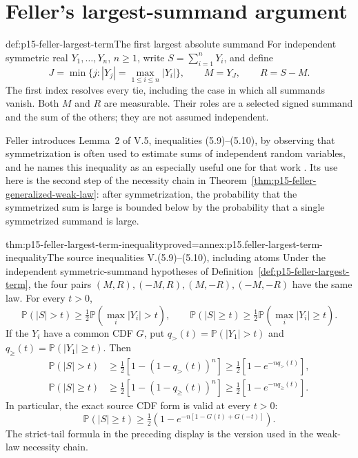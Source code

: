 \section{Feller's largest-summand argument}
\label{sec:p15-feller-largest-summand}

\begin{hbdefinition}{def:p15-feller-largest-term}{The first largest absolute summand}
For independent symmetric real \(Y_1,\ldots,Y_n\), \(n\geq1\),
write \(S=\sum_{i=1}^nY_i\), and define
\[
 J=\min\{j:|Y_j|=\max_{1\leq i\leq n}|Y_i|\},\qquad
 M=Y_J,\qquad R=S-M.
\]
The first index resolves every tie, including the case in which all
summands vanish. Both \(M\) and \(R\) are measurable. Their roles
are a selected signed summand and the sum of the others; they are
not assumed independent.
\end{hbdefinition}

Feller introduces Lemma~2 of V.5, inequalities (5.9)--(5.10), by
observing that symmetrization is often used to estimate sums of
independent random variables, and he names this inequality as an
especially useful one for that work
\cite[V.5, p.~149]{Feller1971ProbabilityII}. Its use here is the
second step of the necessity chain in
Theorem~\ref{thm:p15-feller-generalized-weak-law}: after
symmetrization, the probability that the symmetrized sum is large is
bounded below by the probability that a single symmetrized summand is
large.

\begin{hbtheorem}{thm:p15-feller-largest-term-inequality}{proved=annex:p15.feller-largest-term-inequality}{The source inequalities V.(5.9)--(5.10), including atoms}
Under the independent symmetric-summand hypotheses of
Definition~\ref{def:p15-feller-largest-term},
the four pairs \((M,R),(-M,R),(M,-R),(-M,-R)\) have the same
law. For every \(t>0\),
\[
 \mathbb P(|S|>t)\geq\tfrac12
                    \mathbb P(\max_i|Y_i|>t),\qquad
 \mathbb P(|S|\geq t)\geq\tfrac12
                    \mathbb P(\max_i|Y_i|\geq t).
\]
If the \(Y_i\) have a common CDF \(G\), put
\(q_>(t)=\mathbb P(|Y_1|>t)\) and
\(q_\geq(t)=\mathbb P(|Y_1|\geq t)\). Then
\[
 \begin{aligned}
 \mathbb P(|S|>t)&\geq\tfrac12[1-(1-q_>(t))^n]
                         \geq\tfrac12[1-e^{-nq_>(t)}],\\
 \mathbb P(|S|\geq t)&\geq\tfrac12[1-(1-q_\geq(t))^n]
                         \geq\tfrac12[1-e^{-nq_\geq(t)}].
 \end{aligned}
\]
In particular, the exact source CDF form is valid at every \(t>0\):
\[
 \mathbb P(|S|\geq t)
       \geq\tfrac12\left(1-e^{-n[1-G(t)+G(-t)]}\right).
\]
The strict-tail formula in the preceding display is the version used
in the weak-law necessity chain.
\end{hbtheorem}

